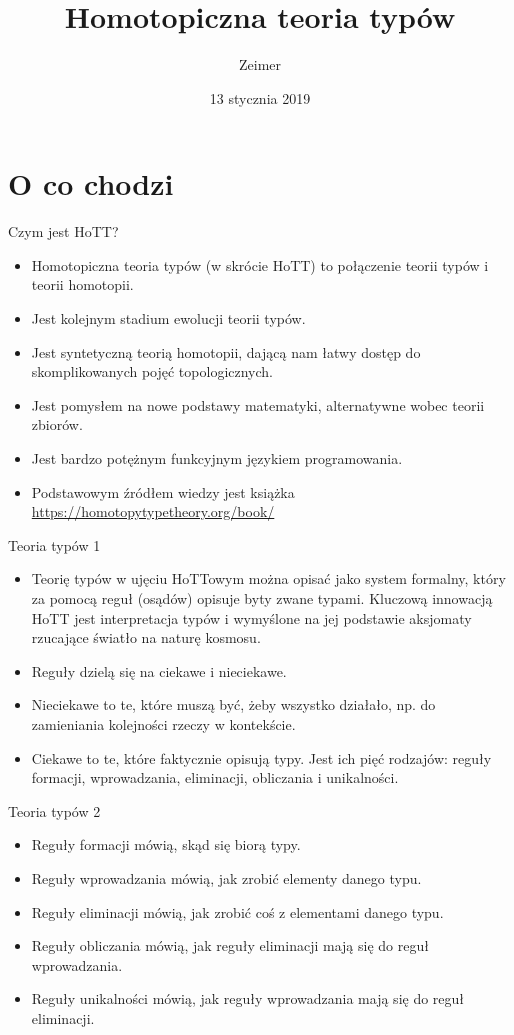 \documentclass{beamer}
\title{Homotopiczna teoria typów}
\author{Zeimer}
\date{13 stycznia 2019}
\begin{document}
\frame{\titlepage}

\frame{\tableofcontents}

\section{O co chodzi}

\begin{frame}{Czym jest HoTT?}
\begin{itemize}
	\item Homotopiczna teoria typów (w skrócie HoTT) to połączenie teorii typów i teorii homotopii.
	\item Jest kolejnym stadium ewolucji teorii typów.
	\item Jest syntetyczną teorią homotopii, dającą nam łatwy dostęp do skomplikowanych pojęć topologicznych.
	\item Jest pomysłem na nowe podstawy matematyki, alternatywne wobec teorii zbiorów.
	\item Jest bardzo potężnym funkcyjnym językiem programowania.
	\item Podstawowym źródłem wiedzy jest książka \url{https://homotopytypetheory.org/book/}
\end{itemize}
\end{frame}

\begin{frame}{Teoria typów 1}
\begin{itemize}
	\item Teorię typów w ujęciu HoTTowym można opisać jako system formalny, który za pomocą reguł (osądów) opisuje byty zwane typami. Kluczową innowacją HoTT jest interpretacja typów i wymyślone na jej podstawie aksjomaty rzucające światło na naturę kosmosu.
	\item Reguły dzielą się na ciekawe i nieciekawe.
	\item Nieciekawe to te, które muszą być, żeby wszystko działało, np. do zamieniania kolejności rzeczy w kontekście.
	\item Ciekawe to te, które faktycznie opisują typy. Jest ich pięć rodzajów: reguły formacji, wprowadzania, eliminacji, obliczania i unikalności.
\end{itemize}
\end{frame}

\begin{frame}{Teoria typów 2}
\begin{itemize}
	\item Reguły formacji mówią, skąd się biorą typy.
	\item Reguły wprowadzania mówią, jak zrobić elementy danego typu.
	\item Reguły eliminacji mówią, jak zrobić coś z elementami danego typu.
	\item Reguły obliczania mówią, jak reguły eliminacji mają się do reguł wprowadzania.
	\item Reguły unikalności mówią, jak reguły wprowadzania mają się do reguł eliminacji.
\end{itemize}
\end{frame}
\end{document}
